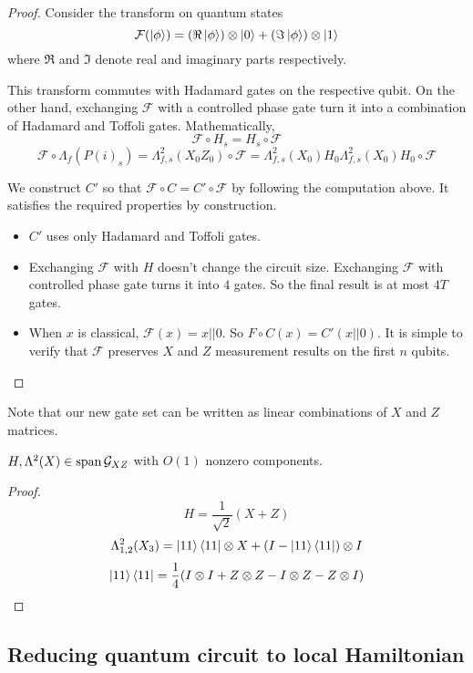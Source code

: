 \begin{proof}
	Consider the transform on quantum states
	$$\mathcal{F}(\ket{\phi})=(\Re\ket{\phi})\otimes\ket{0}+(\Im\ket{\phi})\otimes\ket{1}$$
	where $\Re$ and $\Im$ denote real and imaginary parts respectively.

	This transform commutes with Hadamard gates on the respective qubit. On the other hand, exchanging $\mathcal{F}$ with a controlled phase gate turn it into a combination of Hadamard and Toffoli gates. Mathematically,
	$$\mathcal{F}\circ H_s=H_s\circ\mathcal{F}$$
	$$\mathcal{F}\circ\Lambda_f(P(i)_s)=\Lambda^2_{f,s}(X_0Z_0)\circ\mathcal{F}=\Lambda^2_{f,s}(X_0)H_0\Lambda^2_{f,s}(X_0)H_0\circ\mathcal{F}$$

	We construct $C'$ so that $\mathcal{F}\circ C=C'\circ\mathcal{F}$ by following the computation above. It satisfies the required properties by construction.
	\begin{itemize}
		\item $C'$ uses only Hadamard and Toffoli gates.
		\item Exchanging $\mathcal{F}$ with $H$ doesn't change the circuit size. Exchanging $\mathcal{F}$ with controlled phase gate turns it into $4$ gates. So the final result is at most $4T$ gates.
		\item When $x$ is classical, $\mathcal{F}(x)=x||0$. So $F\circ C(x)=C'(x||0)$. It is simple to verify that $\mathcal{F}$ preserves $X$ and $Z$ measurement results on the first $n$ qubits.
	\end{itemize}
\end{proof}

Note that our new gate set can be written as linear combinations of $X$ and $Z$ matrices.

\begin{thm}
	$H,\Lambda^2(X)\in\operatorname*{\operatorname{span}}\mathcal{G}_{XZ}$ with $O(1)$ nonzero components.
\end{thm}

\begin{proof}
	$$H=\frac{1}{\sqrt{2}}(X+Z)$$
	$$\Lambda^2_{1,2}(X_3)=\ket{11}\bra{11}\otimes X+(I-\ket{11}\bra{11})\otimes I$$
	$$\ket{11}\bra{11}=\frac{1}{4}(I\otimes I+Z\otimes Z-I\otimes Z-Z\otimes I)$$
\end{proof}

\subsection{Reducing quantum circuit to local Hamiltonian}

